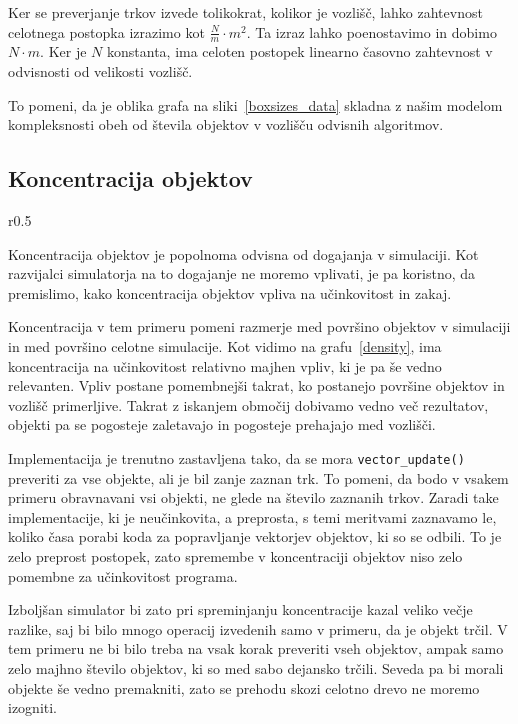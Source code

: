 \documentclass[a4paper,12pt]{article}
\begin{document}
Ker se preverjanje trkov izvede tolikokrat, kolikor je vozlišč, lahko zahtevnost celotnega postopka
izrazimo kot {\small$ \frac{N}{m} \cdot m^2 $}. Ta izraz lahko poenostavimo in dobimo $N \cdot m$. Ker je
$N$ konstanta, ima celoten postopek linearno časovno zahtevnost v odvisnosti od velikosti vozlišč.

To pomeni, da je oblika grafa na sliki~\ref{boxsizes_data} skladna z našim modelom kompleksnosti obeh
od števila objektov v vozlišču odvisnih algoritmov. 

\clearpage
\subsection{Koncentracija objektov}

\begin{wrapfigure}{r}{0.5\textwidth}
    \caption{Vpliv gostote objektov na hitrost simulatorja}
    \label{density}
\end{wrapfigure}

Koncentracija objektov je popolnoma odvisna od dogajanja v simulaciji. Kot razvijalci simulatorja na to
dogajanje ne moremo vplivati, je pa koristno, da premislimo, kako koncentracija objektov vpliva na učinkovitost in zakaj.

Koncentracija v tem primeru pomeni razmerje med površino objektov v simulaciji in med površino celotne simulacije.
Kot vidimo na grafu~\ref{density}, ima koncentracija na učinkovitost relativno majhen vpliv, ki je pa še vedno relevanten.
Vpliv postane pomembnejši takrat, ko postanejo površine objektov in vozlišč primerljive. Takrat z iskanjem območij dobivamo
vedno več rezultatov, objekti pa se pogosteje zaletavajo in pogosteje prehajajo med vozlišči.

Implementacija je trenutno zastavljena tako, da se mora \lstinline|vector_update()| preveriti za vse objekte,
ali je bil zanje zaznan trk. To pomeni, da bodo v vsakem primeru obravnavani vsi objekti, ne glede na število zaznanih trkov.
Zaradi take implementacije, ki je neučinkovita, a preprosta, s temi meritvami zaznavamo le, koliko časa porabi
koda za popravljanje vektorjev objektov, ki so se odbili. To je zelo preprost postopek, zato spremembe v koncentraciji
objektov niso zelo pomembne za učinkovitost programa.

Izboljšan simulator bi zato pri spreminjanju koncentracije kazal veliko večje razlike, saj bi bilo mnogo
operacij izvedenih samo v primeru, da je objekt trčil. V tem primeru ne bi bilo treba na vsak korak preveriti vseh objektov,
ampak samo zelo majhno število objektov, ki so med sabo dejansko trčili. Seveda pa bi morali objekte še vedno premakniti,
zato se prehodu skozi celotno drevo ne moremo izogniti.
\newpage
\end{document}
